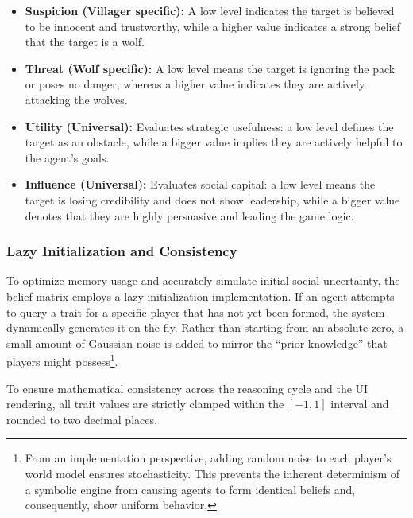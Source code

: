 \begin{itemize}
    \item \textbf{Suspicion (Villager specific):} A low level indicates the target is believed to be innocent and trustworthy, while a higher value indicates a strong belief that the target is a wolf.
    \item \textbf{Threat (Wolf specific):} A low level means the target is ignoring the pack or poses no danger, whereas a higher value indicates they are actively attacking the wolves.
    \item \textbf{Utility (Universal):} Evaluates strategic usefulness: a low level defines the target as an obstacle, while a bigger value implies they are actively helpful to the agent's goals.
    \item \textbf{Influence (Universal):} Evaluates social capital: a low level means the target is losing credibility and does not show leadership, while a bigger value denotes that they are highly persuasive and leading the game logic.
\end{itemize}


\subsubsection{Lazy Initialization and Consistency}
To optimize memory usage and accurately simulate initial social uncertainty, the belief matrix employs a lazy initialization implementation. If an agent attempts to query a trait for a specific player that has not yet been formed, the system dynamically generates it on the fly. Rather than starting from an absolute zero, a small amount of Gaussian noise is added to mirror the ``prior knowledge'' that players might possess\footnote{From an implementation perspective, adding random noise to each player's world model ensures stochasticity. This prevents the inherent determinism of a symbolic engine from causing agents to form identical beliefs and, consequently, show uniform behavior.}. 

To ensure mathematical consistency across the reasoning cycle and the UI rendering, all trait values are strictly clamped within the $[-1, 1]$ interval and rounded to two decimal places.


